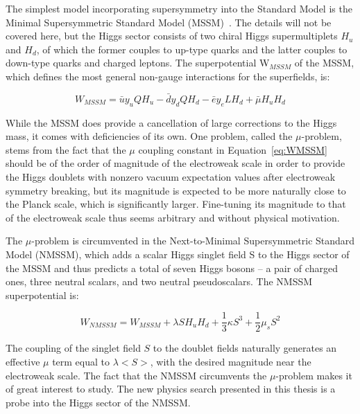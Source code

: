 The simplest model incorporating supersymmetry into the Standard Model is the Minimal Supersymmetric Standard Model (MSSM)~\cite{Martin:1997ns}. The details will not be covered here, but the Higgs sector consists of two chiral Higgs supermultiplets $H_u$ and $H_d$, of which the former couples to up-type quarks and the latter couples to down-type quarks and charged leptons. The superpotential W$_{MSSM}$ of the MSSM, which defines the most general non-gauge interactions for the superfields, is:

\begin{equation}
W_{MSSM} = \bar{u}y_{u}QH_{u} - \bar{d}y_{d}QH_{d} - \bar{e}y_{e}LH_{d} + \bar{\mu}H_{u}H_{d}
\label{eq:WMSSM}
\end{equation}

While the MSSM does provide a cancellation of large corrections to the Higgs mass, it comes with deficiencies of its own. One problem, called the $\mu$-problem, stems from the fact that the $\mu$ coupling constant in Equation~\ref{eq:WMSSM} should be of the order of magnitude of the electroweak scale in order to provide the Higgs doublets with nonzero vacuum expectation values after electroweak symmetry breaking, but its magnitude is expected to be more naturally close to the Planck scale, which is significantly larger. Fine-tuning its magnitude to that of the electroweak scale thus seems arbitrary and without physical motivation.

The $\mu$-problem is circumvented in the Next-to-Minimal Supersymmetric Standard Model (NMSSM), which adds a scalar Higgs singlet field S to the Higgs sector of the MSSM and thus predicts a total of seven Higgs bosons -- a pair of charged ones, three neutral scalars, and two neutral pseudoscalars. The NMSSM superpotential is:

\begin{equation}
W_{NMSSM} = W_{MSSM} + \lambda SH_{u}H_{d} + \frac{1}{3}\kappa S^3 + \frac{1}{2}\mu_{s}S^2
\label{eq:WNMSSM}
\end{equation}

The coupling of the singlet field $S$ to the doublet fields naturally generates an effective $\mu$ term equal to $\lambda$$<S>$, with the desired magnitude near the electroweak scale. The fact that the NMSSM circumvents the $\mu$-problem makes it of great interest to study. The new physics search presented in this thesis is a probe into the Higgs sector of the NMSSM.